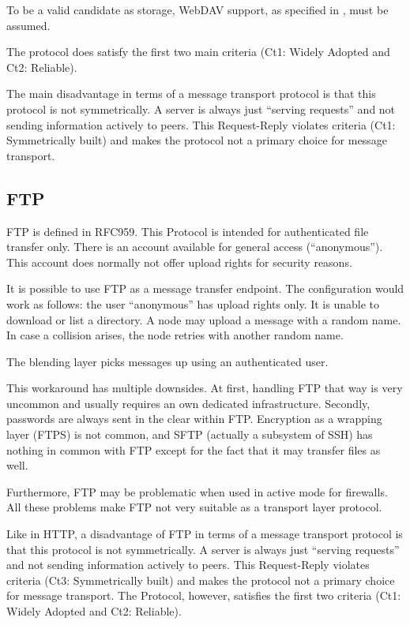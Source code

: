 \documentclass[a4paper,appendixprefix,pdfusetitle,twocolumn,fontsize=8pt,draft,DIV=calc,8pt]{\doctype} %
\begin{document}
To be a valid candidate as storage, WebDAV support, as specified in \cite{rfc4918}, must be assumed.

The protocol does satisfy the first two main criteria (Ct1: Widely Adopted and Ct2: Reliable).

The main disadvantage in terms of a message transport protocol is that this protocol is not symmetrically. A server is always just ``serving requests'' and not sending information actively to peers. This Request-Reply violates criteria (Ct1: Symmetrically built) and makes the protocol not a primary choice for message transport. 

\subsection{FTP}
FTP is defined in RFC959\cite{RFC959}. This Protocol is intended for authenticated file transfer only. There is an account available for general access (``anonymous''). This account does normally not offer upload rights for security reasons.

It is possible to use FTP as a message transfer endpoint. The configuration would work as follows: the user ``anonymous'' has upload rights only. It is unable to download or list a directory. A node may upload a message with a random name. In case a collision arises, the node retries with another random name.

The blending layer picks messages up using an authenticated user.

This workaround has multiple downsides. At first, handling FTP that way is very uncommon and usually requires an own dedicated infrastructure. Secondly, passwords are always sent in the clear within FTP. Encryption as a wrapping layer (FTPS) is not common, and SFTP (actually a subsystem of SSH) has nothing in common with FTP except for the fact that it may transfer files as well.

Furthermore, FTP may be problematic when used in active mode for firewalls. All these problems make FTP not very suitable as a transport layer protocol.

Like in HTTP, a disadvantage of FTP in terms of a message transport protocol is that this protocol is not symmetrically. A server is always just ``serving requests'' and not sending information actively to peers. This Request-Reply violates criteria (Ct3: Symmetrically built) and makes the protocol not a primary choice for message transport. The Protocol, however, satisfies the first two criteria  (Ct1: Widely Adopted and Ct2: Reliable).
\end{document}
